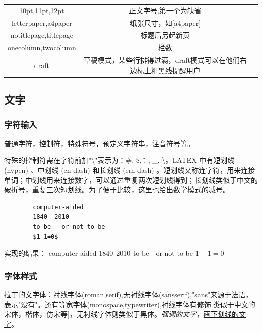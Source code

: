 \documentclass[16pt]{article}
\begin{document}
\begin{table}
    \begin{tabular}{ccc}
        \hline
        10pt,11pt,12pt        & 正文字号,第一个为缺省                                               \\
        letterpaper,a4paper   & 纸张尺寸，如[a4paper]                                               \\
        notitlepage,titlepage & 标题后另起新页                                                      \\
        onecolumn,twocolumn   & 栏数                                                                \\
        draft                 & 草稿模式，某些行排得过满，draft模式可以在他们右边标上粗黑线提醒用户 \\
        \hline
    \end{tabular}
\end{table}
\subsection{文字}

\subsubsection{字符输入}
普通字符，控制符，特殊符号，预定义字符串，注音符号等。
\par
特殊的控制符需在字符前加"\textbackslash"表示为：\#,  \$,  \^,  \-,  \_,  \textbackslash。LATEX 中有短划线 (hypen) 、中划线 (en-dash) 和长划线 (em-dash) 。短划线又称连字符，用来连接单词；中划线用来连接数字，可以通过重复两次短划线得到；长划线类似于中文的破折号，重复三次短划线。为了便于比较，这里也给出数学模式的减号。
\begin{lstlisting}
        computer-aided
        1840--2010
        to be---or not to be
        $1-1=0$ 
    \end{lstlisting}
实现的结果：
computer-aided
1840--2010
to be---or not to be
$1-1=0$


\subsubsection{字体样式}
拉丁的文字体：衬线字体(roman,serif),无衬线字体(sansserif),"sans"来源于法语，表示"没有"。还有等宽字体(monospace,typewriter),衬线字体有修饰[类似于中文的宋体，楷体，仿宋等]，无衬线字体则类似于黑体。\emph{强调的文字}，\underline{画下划线的文字}。
\par
\end{document}
